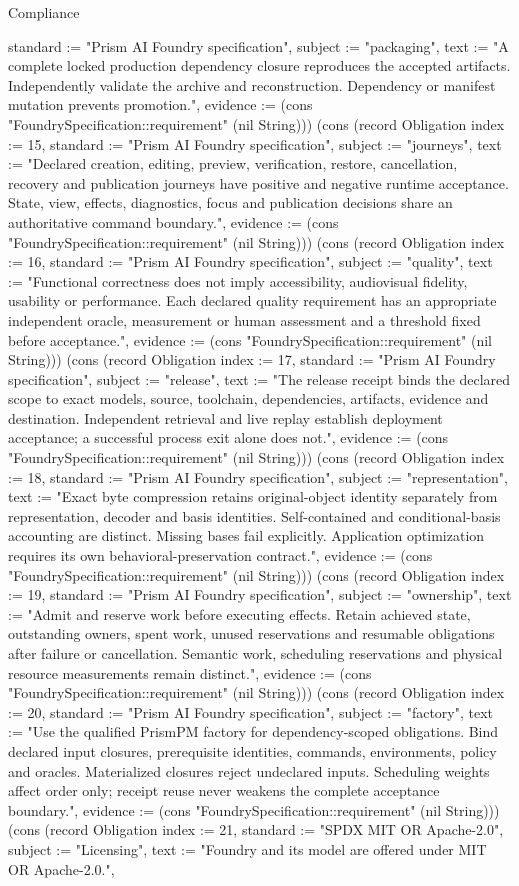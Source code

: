 \begin{lexlean}{Compliance}
\begin{semanticmodule}
{standard := "Prism AI Foundry specification", subject := "packaging", text := "A complete locked production dependency closure reproduces the accepted artifacts. Independently validate the archive and reconstruction. Dependency or manifest mutation prevents promotion.", evidence := (cons "FoundrySpecification::requirement" (nil String))}) (cons (record Obligation {index := 15, standard := "Prism AI Foundry specification", subject := "journeys", text := "Declared creation, editing, preview, verification, restore, cancellation, recovery and publication journeys have positive and negative runtime acceptance. State, view, effects, diagnostics, focus and publication decisions share an authoritative command boundary.", evidence := (cons "FoundrySpecification::requirement" (nil String))}) (cons (record Obligation {index := 16, standard := "Prism AI Foundry specification", subject := "quality", text := "Functional correctness does not imply accessibility, audiovisual fidelity, usability or performance. Each declared quality requirement has an appropriate independent oracle, measurement or human assessment and a threshold fixed before acceptance.", evidence := (cons "FoundrySpecification::requirement" (nil String))}) (cons (record Obligation {index := 17, standard := "Prism AI Foundry specification", subject := "release", text := "The release receipt binds the declared scope to exact models, source, toolchain, dependencies, artifacts, evidence and destination. Independent retrieval and live replay establish deployment acceptance; a successful process exit alone does not.", evidence := (cons "FoundrySpecification::requirement" (nil String))}) (cons (record Obligation {index := 18, standard := "Prism AI Foundry specification", subject := "representation", text := "Exact byte compression retains original-object identity separately from representation, decoder and basis identities. Self-contained and conditional-basis accounting are distinct. Missing bases fail explicitly. Application optimization requires its own behavioral-preservation contract.", evidence := (cons "FoundrySpecification::requirement" (nil String))}) (cons (record Obligation {index := 19, standard := "Prism AI Foundry specification", subject := "ownership", text := "Admit and reserve work before executing effects. Retain achieved state, outstanding owners, spent work, unused reservations and resumable obligations after failure or cancellation. Semantic work, scheduling reservations and physical resource measurements remain distinct.", evidence := (cons "FoundrySpecification::requirement" (nil String))}) (cons (record Obligation {index := 20, standard := "Prism AI Foundry specification", subject := "factory", text := "Use the qualified PrismPM factory for dependency-scoped obligations. Bind declared input closures, prerequisite identities, commands, environments, policy and oracles. Materialized closures reject undeclared inputs. Scheduling weights affect order only; receipt reuse never weakens the complete acceptance boundary.", evidence := (cons "FoundrySpecification::requirement" (nil String))}) (cons (record Obligation {index := 21, standard := "SPDX MIT OR Apache-2.0", subject := "Licensing", text := "Foundry and its model are offered under MIT OR Apache-2.0.", }
\end{semanticmodule}
\end{lexlean}
